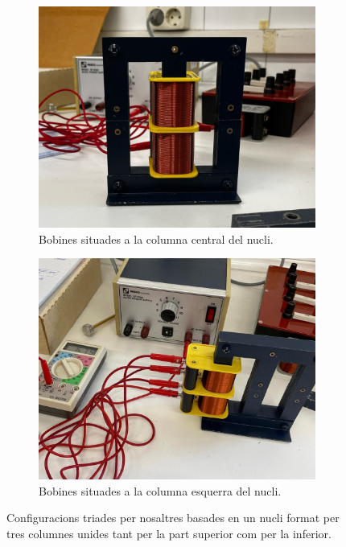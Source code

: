 \documentclass[a4paper,10.5pt]{report}
\begin{document}
\begin{figure}[h]
	\centering
	\begin{subfigure}[b]{0.35\textwidth}
		\centering
		\includegraphics[width=\textwidth]{inv1.jpg}
		\caption{Bobines situades a la columna central del nucli.}
		\label{fig4:3a}
	\end{subfigure}
	\hspace{2cm}
	\begin{subfigure}[b]{0.35\textwidth}
		\centering
		\includegraphics[width=\textwidth]{inv2.jpg}
		\caption{Bobines situades a la columna esquerra del nucli.}
		\label{fig4:3b}
	\end{subfigure}
	\caption{Configuracions triades per nosaltres basades en un nucli format per tres columnes unides tant per la part superior com per la inferior.}
	\label{fig4:3}
\end{figure}
\end{document}
